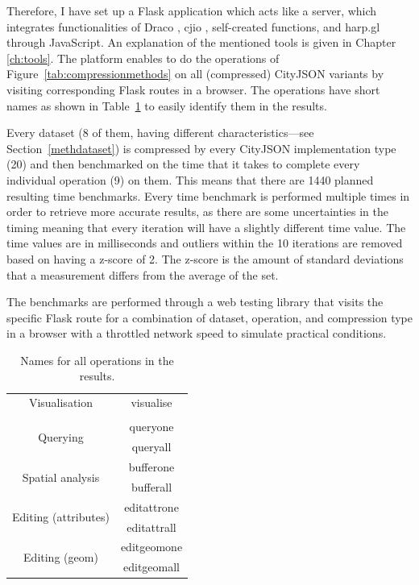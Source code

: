 Therefore, I have set up a Flask application which acts like a server, which integrates functionalities of Draco \citep{dracoperformance}, cjio \citep{cjio}, self-created functions, and harp.gl \citep{harpgl} through JavaScript.
An explanation of the mentioned tools is given in Chapter \ref{ch:tools}.
The platform enables to do the operations of Figure~\ref{tab:compressionmethods} on all (compressed) CityJSON variants by visiting corresponding Flask routes in a browser.
The operations have short names as shown in Table~\ref{tab:operationnames} to easily identify them in the results.


Every dataset (8 of them, having different characteristics---see Section~\ref{methdataset}) is compressed by every CityJSON implementation type (20) and then benchmarked on the time that it takes to complete every individual operation (9) on them.
This means that there are 1440 planned resulting time benchmarks.
Every time benchmark is performed multiple times in order to retrieve more accurate results, as there are some uncertainties in the timing meaning that every iteration will have a slightly different time value.
The time values are in milliseconds and outliers within the 10 iterations are removed based on having a z-score of 2.
The z-score is the amount of standard deviations that a measurement differs from the average of the set.

The benchmarks are performed through a web testing library that visits the specific Flask route for a combination of dataset, operation, and compression type in a browser with a throttled network speed to simulate practical conditions.

\begin{table}[h!]
\begin{tabular}{|c|c|}
    \hline
    Visualisation&visualise\\
    &\\
    \hline
    \multirow{2}{*}{Querying}&queryone\\
    &queryall\\
    \hline
    \multirow{2}{*}{Spatial analysis}&bufferone\\
    &bufferall\\
    \hline
    \multirow{2}{*}{Editing (attributes)}&editattrone\\
    &editattrall\\
    \hline
    \multirow{2}{*}{Editing (geom)}&editgeomone\\
    &editgeomall\\
\hline
\end{tabular}
\caption{Names for all operations in the results.}
\label{tab:operationnames}
\end{table}



